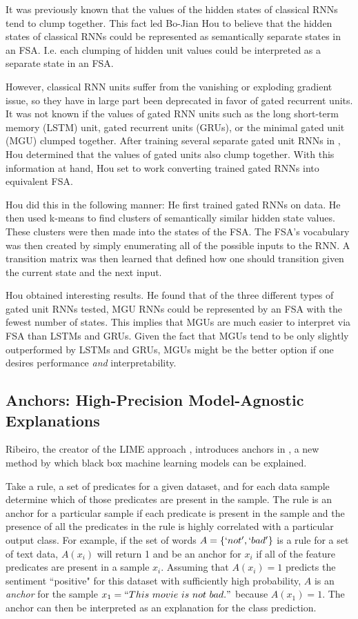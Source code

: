 \documentclass[12pt, letterpaper]{article}
\begin{document}
It was previously known that the values of the hidden states of classical RNNs tend to clump together. This fact led Bo-Jian Hou to believe that the hidden states of classical RNNs could be represented as semantically separate states in an FSA. I.e. each clumping of hidden unit values could be interpreted as a separate state in an FSA.

However, classical RNN units suffer from the vanishing or exploding gradient issue, so they have in large part been deprecated in favor of gated recurrent units.
It was not known if the values of gated RNN units such as the long short-term memory (LSTM) unit, gated recurrent units (GRUs), or the minimal gated unit (MGU) clumped together. After training several separate gated unit RNNs in \cite{interp_rnn}, Hou determined that the values of gated units also clump together.
With this information at hand, Hou set to work converting trained gated RNNs into equivalent FSA.

Hou did this in the following manner: He first trained gated RNNs on data. He then used k-means to find clusters of semantically similar hidden state values. These clusters were then made into the states of the FSA. The FSA's vocabulary was then created by simply enumerating all of the possible inputs to the RNN. A transition matrix was then learned that defined how one should transition given the current state and the next input. 

Hou obtained interesting results. He found that of the three different types of gated unit RNNs tested, MGU RNNs could be represented by an FSA with the fewest number of states. This implies  that MGUs are much easier to interpret via FSA than LSTMs and GRUs. Given the fact that MGUs tend to be only slightly outperformed by LSTMs and GRUs, MGUs might be the better option if one desires performance \textit{and} interpretability.
\subsection{Anchors: High-Precision Model-Agnostic Explanations}
	Ribeiro, the creator of the LIME approach \cite{LIME}, introduces anchors in \cite{anchors}, a new method by which black box machine learning models can be explained. 
	
	Take a rule, a set of predicates for a given dataset, and for each data sample determine which of those predicates are present in the sample.
	The rule is an anchor for a particular sample if each predicate is present in the sample and the presence of all the predicates in the rule is highly correlated with a particular output class.
	For example, if the set of words $A = \{`not', `bad'\}$ is a rule for a set of text data, $A(x_{i})$ will return 1 and be an anchor for $x_{i}$ if all of the feature predicates are present in a sample $x_{i}$.
	Assuming that $A(x_{i}) = 1$ predicts the sentiment ``positive" for this dataset with sufficiently high probability, $A$ is an \textit{anchor} for the sample $x_{1} = ``This\ movie\ is\ not\ bad."$ because $A(x_{1}) = 1$.
	The anchor can then be interpreted as an explanation for the class prediction.
	
\end{document}
